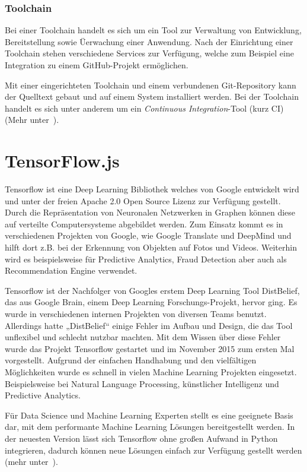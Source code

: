 \subsubsection{Toolchain}
Bei einer Toolchain handelt es sich um ein Tool zur Verwaltung von Entwicklung, Bereitstellung sowie Üerwachung einer
Anwendung. Nach der Einrichtung einer Toolchain stehen verschiedene Services zur Verfügung, welche zum Beispiel eine
Integration zu einem GitHub-Projekt ermöglichen.

Mit einer eingerichteten Toolchain und einem verbundenen Git-Repository kann der Quelltext gebaut und auf einem System
installiert werden. Bei der Toolchain handelt es sich unter anderem um ein \textit{Continuous Integration}-Tool (kurz CI)
(Mehr unter~\cite{online_grundlagen_toolchain}).

\section{TensorFlow.js}
Tensorflow ist eine Deep Learning Bibliothek welches von Google entwickelt wird und unter der freien Apache 2.0 Open
Source Lizenz zur Verfügung gestellt. Durch die Repräsentation von Neuronalen Netzwerken in Graphen können diese auf
verteilte Computersysteme abgebildet werden. Zum Einsatz kommt es in verschiedenen Projekten von Google, wie Google
Translate und DeepMind und hilft dort z.B. bei der Erkennung von Objekten auf Fotos und Videos. Weiterhin wird es
beispielsweise für Predictive Analytics, Fraud Detection aber auch als Recommendation Engine verwendet.

Tensorflow ist der Nachfolger von Googles erstem Deep Learning Tool DistBelief, das aus Google Brain, einem Deep
Learning Forschungs-Projekt, hervor ging. Es wurde in verschiedenen internen Projekten von diversen Teams benutzt.
Allerdings hatte „DistBelief“ einige Fehler im Aufbau und Design, die das Tool unflexibel und schlecht nutzbar machten.
Mit dem Wissen über diese Fehler wurde das Projekt Tensorflow gestartet und im November 2015 zum ersten Mal vorgestellt.
Aufgrund der einfachen Handhabung und den vielfältigen Möglichkeiten wurde es schnell in vielen Machine Learning
Projekten eingesetzt. Beispielsweise bei Natural Language Processing, künstlicher Intelligenz und Predictive Analytics.

Für Data Science und Machine Learning Experten stellt es eine geeignete Basis dar, mit dem performante Machine Learning
Lösungen bereitgestellt werden. In der neuesten Version lässt sich Tensorflow ohne großen Aufwand in Python integrieren,
dadurch können neue Lösungen einfach zur Verfügung gestellt werden (mehr unter~\cite{book_grundlagen_tensorflow}).

